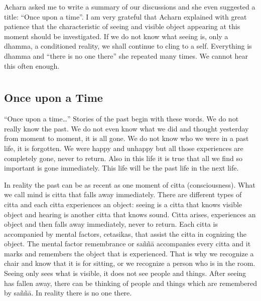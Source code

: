 Acharn asked me to write a summary of our discussions and she even
suggested a title: ``Once upon a time''. I am very grateful that Acharn
explained with great patience that the characteristic of seeing and
visible object appearing at this moment should be investigated. If we do
not know what seeing is, only a dhamma, a conditioned reality, we shall
continue to cling to a self. Everything is dhamma and ``there is no one
there'' she repeated many times. We cannot hear this often enough.

\chapter[Once upon a Time]{}
\section*{Once upon a Time}


``Once upon a time\ldots{}'' Stories of the past begin with these words.
We do not really know the past. We do not even know what we did and
thought yesterday from moment to moment, it is all gone. We do not know
who we were in a past life, it is forgotten. We were happy and unhappy
but all those experiences are completely gone, never to return. Also in
this life it is true that all we find so important is gone immediately.
This life will be the past life in the next life.

In reality the past can be as recent as one moment of citta
(consciousness). What we call mind is citta that falls away immediately.
There are different types of citta and each citta experiences an object:
seeing is a citta that knows visible object and hearing is another citta
that knows sound. Citta arises, experiences an object and then falls
away immediately, never to return. Each citta is accompanied by mental
factors, cetasikas, that assist the citta in cognizing the object. The
mental factor remembrance or saññā accompanies every citta and it marks
and remembers the object that is experienced. That is why we recognize a
chair and know that it is for sitting, or we recognize a person who is
in the room. Seeing only sees what is visible, it does not see people
and things. After seeing has fallen away, there can be thinking of
people and things which are remembered by saññā. In reality there is no
one there. 

